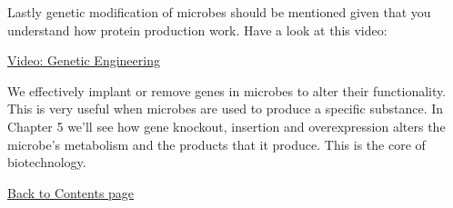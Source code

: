\documentclass[11pt]{article}
\begin{document}
Lastly genetic modification of microbes should be mentioned given that
you understand how protein production work. Have a look at this video:

\href{https://www.youtube.com/watch?v=zlqD4UWCuws}{Video: Genetic
Engineering}

We effectively implant or remove genes in microbes to alter their
functionality. This is very useful when microbes are used to produce a
specific substance. In Chapter 5 we'll see how gene knockout, insertion
and overexpression alters the microbe's metabolism and the products that
it produce. This is the core of biotechnology.

\href{https://nbviewer.jupyter.org/github/willienicol/Biochemical-engineering-notes/blob/master/List\%20of\%20contents.ipynb}{Back
to Contents page}


    
    
    
    
\end{document}
